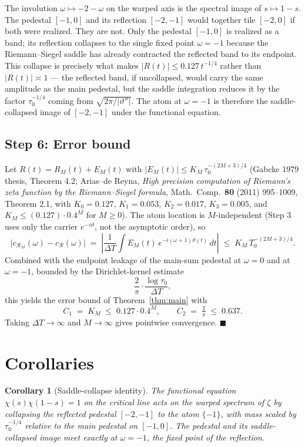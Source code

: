 \documentclass[11pt]{article}
\newtheorem{corollary}{Corollary}
\begin{document}
The involution $\omega\mapsto -2-\omega$ on the warped axis is the spectral image of $s\mapsto 1-s$. The pedestal $[-1,0]$ and its reflection $[-2,-1]$ would together tile $[-2,0]$ if both were realized. They are not. Only the pedestal $[-1,0]$ is realized as a band; its reflection collapses to the single fixed point $\omega=-1$ because the Riemann--Siegel saddle has already contracted the reflected band to its endpoint. This collapse is precisely what makes $|R(t)|\le 0.127\,t^{-1/4}$ rather than $|R(t)|\asymp 1$ --- the reflected band, if uncollapsed, would carry the same amplitude as the main pedestal, but the saddle integration reduces it by the factor $\tau_{0}^{-1/4}$ coming from $\sqrt{2\pi/|\vartheta''|}$. The atom at $\omega=-1$ is therefore the saddle-collapsed image of $[-2,-1]$ under the functional equation.

\subsection*{Step 6: Error bound}

Let $R(t)=R_{M}(t)+E_{M}(t)$ with $|E_{M}(t)|\le K_{M}\,\tau_{0}^{-(2M+3)/4}$ (Gabcke 1979 thesis, Theorem 4.2; Arias--de Reyna, \emph{High precision computation of Riemann's zeta function by the Riemann--Siegel formula}, Math.~Comp.~\textbf{80} (2011) 995--1009, Theorem 2.1, with $K_{0}=0.127$, $K_{1}=0.053$, $K_{2}=0.017$, $K_{3}=0.005$, and $K_{M}\le (0.127)\cdot 0.4^{M}$ for $M\ge 0$). The atom location is $M$-independent (Step 3 uses only the carrier $e^{-i\vartheta}$, not the asymptotic order), so
\[
  \bigl|c_{\mathcal R_{M}}(\omega)-c_{\mathcal R}(\omega)\bigr|
  \;=\; \left|\frac{1}{\Delta T}\int E_{M}(t)\,e^{-i(\omega+1)\vartheta(t)}\,dt\right|
  \;\le\; K_{M}\,T_{0}^{-(2M+3)/4}.
\]
Combined with the endpoint leakage of the main-sum pedestal at $\omega=0$ and at $\omega=-1$, bounded by the Dirichlet-kernel estimate
\[
  \frac{2}{\pi}\cdot\frac{\log\tau_{0}}{\Delta T},
\]
this yields the error bound of Theorem~\ref{thm:main} with
\[
  C_{1} \;=\; K_{M} \;\le\; 0.127\cdot 0.4^{M},
  \qquad
  C_{2} \;=\; \tfrac{2}{\pi} \;\le\; 0.637.
\] Taking $\Delta T\to\infty$ and $M\to\infty$ gives pointwise convergence. $\blacksquare$

\section*{Corollaries}

\begin{corollary}[Saddle-collapse identity]
The functional equation $\chi(s)\chi(1-s)=1$ on the critical line acts on the warped spectrum of $\zeta$ by collapsing the reflected pedestal $[-2,-1]$ to the atom $\{-1\}$, with mass scaled by $\tau_{0}^{-1/4}$ relative to the main pedestal on $[-1,0]$. The pedestal and its saddle-collapsed image meet exactly at $\omega=-1$, the fixed point of the reflection.
\end{corollary}
\end{document}
